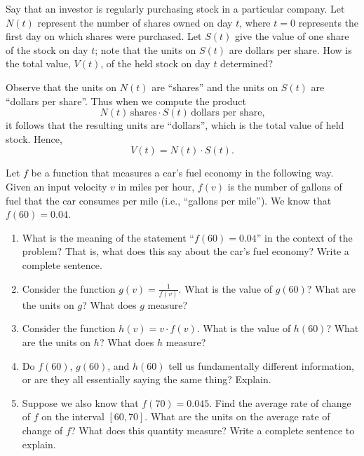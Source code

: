 \documentclass{ximera}
\begin{document}
	\begin{example}
		Say that an investor is regularly purchasing stock in a particular company. Let $N(t)$ represent the number of shares owned on day $t$,
		 where $t = 0$ represents the first day on which shares were purchased. Let $S(t)$ give the value of one share of the stock on day $t$; 
		 note that the units on $S(t)$ are dollars per share. How is the total value, $V(t)$, of the held stock on day $t$ determined?
		\begin{explanation}
			Observe that the units on $N(t)$ are ``shares'' and the units on $S(t)$ are ``dollars per share''.  Thus when we compute the product
			\[N(t) \, \text{shares}  \cdot S(t) \, \text{dollars per share}\text{,}\]
			it follows that the resulting units are ``dollars'', which is the total value of held stock.  Hence,
			\[V(t) = N(t) \cdot S(t)\text{.} \]
		\end{explanation}
	\end{example}



	\begin{exploration}
		Let $f$ be a function that measures a car's fuel economy in the following way. Given an input velocity $v$ in miles per hour, $f(v)$ is the number 
		of gallons of fuel that the car consumes per mile (i.e., ``gallons per mile''). We know that $f(60) = 0.04$.
		\begin{enumerate}
			\item What is the meaning of the statement ``$f(60) = 0.04$'' in the context of the problem? That is, what does this say about 
				the car's fuel economy? Write a complete sentence.
			\item Consider the function $g(v) = \frac{1}{f(v)}$. What is the value of $g(60)$? What are the units on $g$? What does $g$ measure? 
			\item Consider the function $h(v) = v \cdot f(v)$. What is the value of $h(60)$? What are the units on $h$? What does $h$ measure?
			\item Do $f(60)$, $g(60)$, and $h(60)$ tell us fundamentally different information, or are they all essentially saying the same thing?  Explain.
			\item Suppose we also know that $f(70) = 0.045$. Find the average rate of change of $f$ on the interval $[60,70]$. What are the units 
				on the average rate of change of $f$? What does this quantity measure? Write a complete sentence to explain.
		\end{enumerate}
	\end{exploration}	

\end{document}
